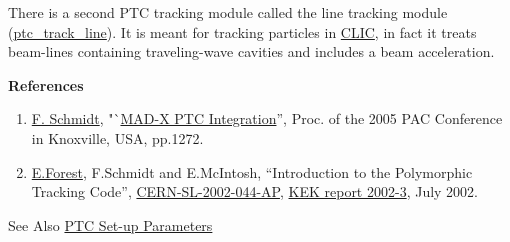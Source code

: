 There is a second PTC tracking module called the line tracking module
(\href{../ptc_track_line/ptc_track_line.html}{ptc\_track\_line}). It is
meant for tracking particles in
\href{http://clic-study.web.cern.ch/CLIC-Study/}{CLIC}, in fact it
treats beam-lines containing traveling-wave cavities and includes a beam
acceleration. 


{\bf References}
\begin{enumerate}
   \item \href{F._Schmidt}{F. Schmidt},
     "`\href{http://cern.ch/madx/doc/MPPE012.pdf}{MAD-X PTC
     Integration}'',  
     Proc. of the 2005 PAC Conference in Knoxville, USA, pp.1272. 
   \item \href{E._Forest}{E.Forest}, F.Schmidt and E.McIntosh,
     ``Introduction to the Polymorphic Tracking Code'',  
     \href{http://cern.ch/madx/doc/sl-2002-044.pdf}{CERN-SL-2002-044-AP}, 
     \href{http://ccdb4fs.kek.jp/cgi-bin/img/allpdf?200302020}{KEK
       report 2002-3}, July 2002. 
\end{enumerate}


See Also \href{../ptc_general/ptc_general.html}{PTC Set-up Parameters}


